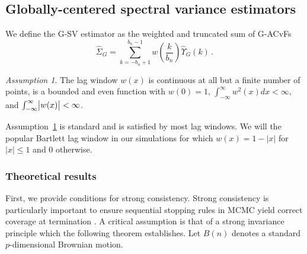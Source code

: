 \documentclass[12pt]{article}
\theoremstyle{remark}
\newtheorem{ass}{Assumption}
\begin{document}
\subsection{Globally-centered spectral variance estimators} %
\label{sub:globally_centered_spectral_variance_estimators}


We define the G-SV estimator as the weighted and truncated sum of G-ACvFs
%
\begin{equation}
\label{eq:gsve_estimator}
    \hat{\Sigma}_{G} = \sum_{k= -b_n+1}^{b_n-1}w\left(\dfrac{k}{b_n}\right)\hat{\Upsilon}_{G}(k)\,.
\end{equation}
%
%

\begin{ass}
\label{ass:lag_window}
The lag window $w(x)$ is continuous at all but a finite number of points, is a bounded and even function with $w(0)=1$, \; $\int_{-\infty}^{\infty}w^2(x)dx < \infty$, and $\int_{-\infty}^{\infty} \abs{w(x)} < \infty$.
\end{ass}

Assumption~\ref{ass:lag_window} is standard \citep[see][]{ande:1971} and is satisfied by most lag windows. We will the popular Bartlett lag window in our simulations for which $w(x) = 1-|x|$ for $|x| \leq 1$ and 0 otherwise.


\subsubsection{Theoretical results} \label{sec:G-SVE}

First, we provide conditions for strong consistency. Strong consistency is particularly important to ensure sequential stopping rules in MCMC yield correct coverage at termination \citep{fleg:gong:2015,glyn:whit:1992}. A critical assumption is that of a strong invariance principle which the following theorem establishes. Let $B(n)$ denotes a standard $p$-dimensional Brownian motion.
\end{document}
